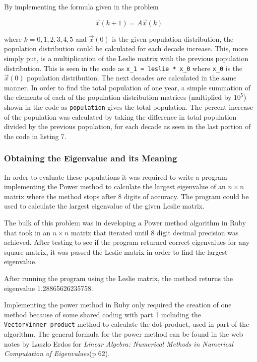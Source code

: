 \documentclass[letterpaper,12pt]{article}
\begin{document}
\vspace{11pt}

By implementing the formula given in the problem

\[\vec{x}(k + 1) = A\vec{x}(k)\]
 
where $k = 0,1,2,3,4,5$ and $\vec{x}(0)$ is the given
population distribution, the population distribution could be calculated for
each decade increase.
This, more simply put, is a multiplication of the Leslie matrix with the
previous population distribution. This is seen in the code as
\texttt{x\_1 = leslie * x\_0} where \texttt{x\_0} is the $\vec{x}(0)$ population
distribution. The next decades are calculated in the same manner.
In order to find the total population of one year, a simple summation of the
elements of each of the population distribution matrices (multiplied by $10^5$)
shown in the code as \texttt{population} gives the total population.
The percent increase of the population was calculated by taking the difference
in total population divided by the previous population,
for each decade as seen in the last portion of the code in listing 7. 

\subsubsection{Obtaining the Eigenvalue and its Meaning}

In order to evaluate these populations it was required to write a program
implementing the Power method to calculate the largest eigenvalue of an
$n \times n$ matrix where the method stops after 8 digits of accuracy.
The program could be used to calculate the largest eigenvalue of the given
Leslie matrix.

The bulk of this problem was in developing a Power method algorithm in Ruby that
took in an $n \times n$ matrix that iterated until 8 digit decimal precision was
achieved.
After testing to see if the program returned correct eigenvalues for any square
matrix, it was passed the Leslie matrix in order to find the largest eigenvalue.

After running the program using the Leslie matrix, the method returns the
eigenvalue 1.28865626235758.

Implementing the power method in Ruby only required the creation of one method
because of some shared coding with part 1 including the
\texttt{Vector\#inner\_product} method to calculate the dot product,
used in part of the algorithm.
The general formula for the power method can be found in the web notes by Laszlo Erdos
for \textit{Linear Algebra: Numerical Methods in Numerical Computation of Eigenvalues}(p 62).
\end{document}
